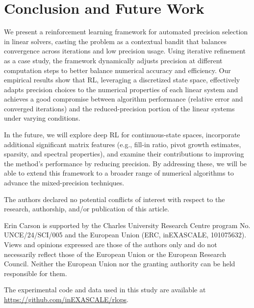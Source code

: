 \documentclass[Afour,sageh,times]{sagej}
\newcommand{\xy}[1]{{\color{black}{#1}}}
\theoremstyle{plain}
\theoremstyle{definition}
\begin{document}
\section{Conclusion and Future Work}
\label{sec:conclusion}

We present a reinforcement learning framework for automated precision selection in linear solvers, casting the problem as a contextual bandit that balances convergence across iterations and low precision usage. Using iterative refinement as a case study, the framework dynamically adjusts precision at different computation steps to better balance numerical accuracy and efficiency. Our empirical results show that RL, leveraging a discretized state space, effectively adapts precision choices to the numerical properties of each linear system and achieves a good compromise between algorithm performance (relative error and converged iterations) and the reduced-precision portion of the linear systems under varying conditions.


In the future, we will explore deep RL for continuous-state spaces, incorporate additional significant matrix features (e.g., fill-in ratio, pivot growth estimates, sparsity, and spectral properties), and examine their contributions to improving the method's performance by reducing precision.  \xy{The native CPU validation evaluates learned FP16/FP32/FP64 configurations in a compiled GMRES-IR solver, so we report solver-level time-to-solution for this CPU implementation, but do not claim measured peak-memory traffic or energy reductions. A natural next step is to evaluate SuiteSparse and application matrices, include additional fixed mixed-precision GMRES-IR baselines, add a dedicated native implementation for architecture-specific timing studies, and replace the current bit-count proxy in the reward with platform-specific runtime, memory-traffic, or energy measurements.} By addressing these, we will be able to extend this framework to a broader range of numerical algorithms to advance the mixed-precision techniques.




\FloatBarrier

\begin{dci}
The authors declared no potential conflicts of interest with respect
to the research, authorship, and/or publication of this article.
\end{dci}

\begin{funding}
Erin Carson is supported by the Charles University Research Centre
program No. UNCE/24/SCI/005 and the European Union
(ERC, inEXASCALE, 101075632). Views and opinions expressed are
those of the authors only and do not necessarily reflect those of
the European Union or the European Research Council. Neither the
European Union nor the granting authority can be held responsible
for them.
\end{funding}

\begin{dataavailability}
The experimental code and data
used in this study are available at
\url{https://github.com/inEXASCALE/rlops}. 
\end{dataavailability}

\FloatBarrier




\end{document}
